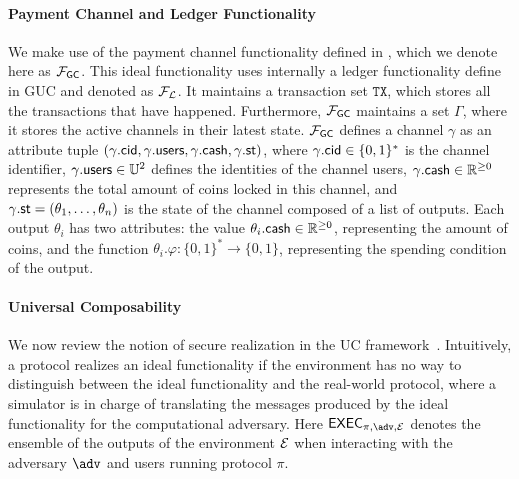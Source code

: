 \paragraph{Payment Channel and Ledger Functionality}
We make use of the payment channel functionality defined in , which we denote here as $\mathcal{F}_{\mathsf{GC}}$. This ideal 
functionality uses internally a ledger functionality define in GUC and denoted as $\mathcal{F}_{\mathcal{L}}$.
It maintains a transaction set $\mathtt{TX}$, which stores all the transactions that have 
happened. Furthermore, $\mathcal{F}_{\mathsf{GC}}$ maintains a set $\Gamma$, where it stores the active 
channels in their latest state. $\mathcal{F}_{\mathsf{GC}}$ defines a channel $\gamma$ as an attribute tuple 
$(\gamma.\mathsf{cid}, \gamma.\mathsf{users}, \gamma.\mathsf{cash}, \gamma.\mathsf{st})$, where $\gamma.\mathsf{cid} \in \{0,1\}^*$ is 
the channel identifier, $\gamma.\mathsf{users} \in \mathbb{U}^2$ defines the identities of the channel 
users, $\gamma.\mathsf{cash} \in \mathbb{R}^{\geq 0}$ represents the total amount of coins locked in 
this channel, and $\gamma.\mathsf{st} = (\theta_1,\ldots,\theta_n)$ is the state of the channel 
composed of a list of outputs. Each output $\theta_i$ has two attributes: the value $\theta_i.
\mathsf{cash} \in \mathbb{R}^{\geq 0}$, representing the amount of coins, and the function $\theta_i.
\varphi \colon \{0,1\}^* \to \{0,1\}$, representing the spending condition of the output. 


\paragraph{Universal Composability}
We now review the notion of secure realization in the UC framework~\cite{canetti}. 
Intuitively, a protocol realizes an ideal functionality if the environment has no way 
to distinguish between the ideal functionality and the real-world protocol, where 
a simulator is in charge of translating the messages produced by the ideal functionality 
for the computational adversary. Here $\exec_{\pi, \adv, \dist}$ denotes the ensemble of 
the outputs of the environment $\mathcal{E}$ when interacting with the adversary $\adv$ and 
users running protocol $\pi$.

